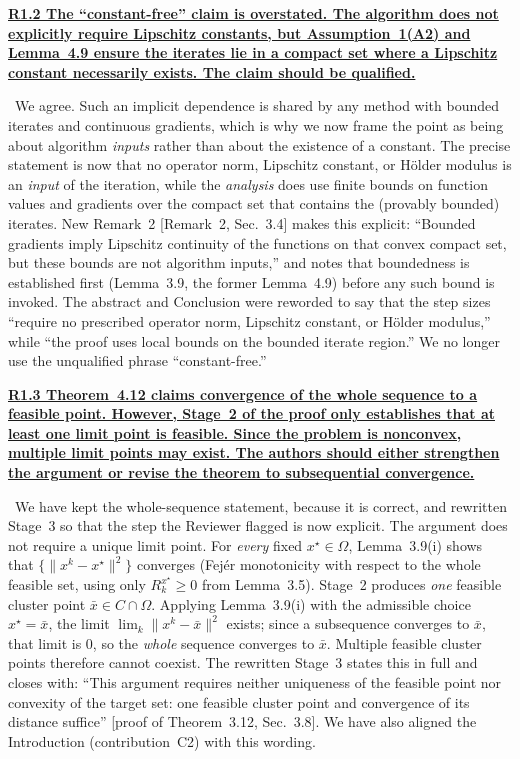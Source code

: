 \documentclass[11pt]{article}
\newcommand{\response}[1]{\smallskip\noindent{\color{blue!60!black}\textbf{Response.}}\ #1\par\medskip}
\newcommand{\loc}[1]{\textcolor{blue!50!black}{[#1]}}
\newenvironment{point}[1]{\medskip\noindent\textbf{\uline{#1}}\par}{\par}
\begin{document}
\begin{point}{R1.2 The ``constant-free'' claim is overstated. The algorithm does not
explicitly require Lipschitz constants, but Assumption~1(A2) and Lemma~4.9 ensure the
iterates lie in a compact set where a Lipschitz constant necessarily exists. The claim
should be qualified.}
\response{We agree. Such an implicit dependence is shared by any method with bounded
iterates and continuous gradients, which is why we now frame the point as being about
algorithm \emph{inputs} rather than about the existence of a constant. The precise statement is now that no
operator norm, Lipschitz constant, or H\"older modulus is an \emph{input} of the
iteration, while the \emph{analysis} does use finite bounds on function values and
gradients over the compact set that contains the (provably bounded) iterates. New
Remark~2 \loc{Remark~2, Sec.~3.4} makes this explicit: ``Bounded gradients imply
Lipschitz continuity of the functions on that convex compact set, but these bounds are
not algorithm inputs,'' and notes that boundedness is established first (Lemma~3.9, the
former Lemma~4.9) before any such bound is invoked. The abstract and Conclusion were
reworded to say that the step sizes ``require no prescribed operator norm, Lipschitz
constant, or H\"older modulus,'' while ``the proof uses local bounds on the bounded
iterate region.'' We no longer use the unqualified phrase ``constant-free.''}
\end{point}

\begin{point}{R1.3 Theorem~4.12 claims convergence of the whole sequence to a feasible
point. However, Stage~2 of the proof only establishes that at least one limit point is
feasible. Since the problem is nonconvex, multiple limit points may exist. The authors
should either strengthen the argument or revise the theorem to subsequential
convergence.}
\response{We have kept the whole-sequence statement, because it is correct, and rewritten
Stage~3 so that the step the Reviewer flagged is now explicit. The argument does not
require a unique limit point. For \emph{every} fixed $x^\star\in\Omega$, Lemma~3.9(i)
shows that $\{\lVert x^k-x^\star\rVert^2\}$ converges (Fej\'er monotonicity with respect
to the whole feasible set, using only $R^{x^\star}_k\ge0$ from Lemma~3.5). Stage~2
produces \emph{one} feasible cluster point $\bar x\in C\cap\Omega$. Applying Lemma~3.9(i)
with the admissible choice $x^\star=\bar x$, the limit $\lim_k\lVert x^k-\bar x\rVert^2$
exists; since a subsequence converges to $\bar x$, that limit is $0$, so the \emph{whole}
sequence converges to $\bar x$. Multiple feasible cluster points therefore cannot coexist.
The rewritten Stage~3 states this in full and closes with: ``This argument requires
neither uniqueness of the feasible point nor convexity of the target set: one feasible
cluster point and convergence of its distance suffice'' \loc{proof of Theorem~3.12,
Sec.~3.8}. We have also aligned the Introduction (contribution~C2) with this wording.}
\end{point}
\end{document}
